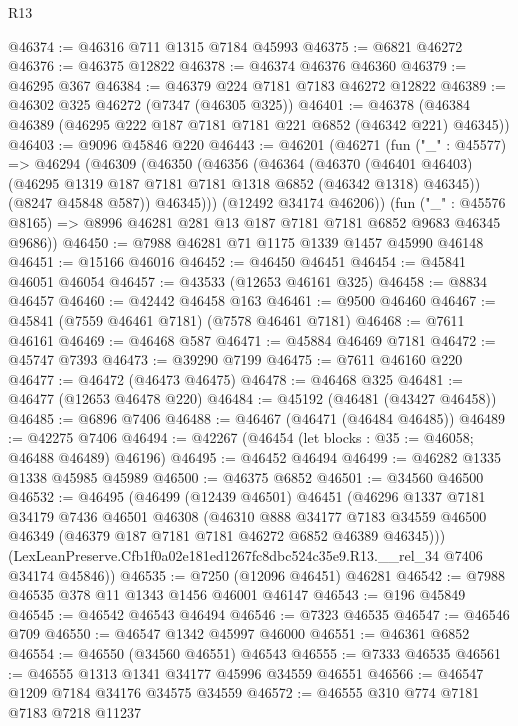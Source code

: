 \begin{lexlean}{R13}
\begin{coremodule}
@46374 := @46316 @711 @1315 @7184 @45993
@46375 := @6821 @46272
@46376 := @46375 @12822
@46378 := @46374 @46376 @46360
@46379 := @46295 @367
@46384 := @46379 @224 @7181 @7183 @46272 @12822
@46389 := @46302 @325 @46272 (@7347 (@46305 @325))
@46401 := @46378 (@46384 @46389 (@46295 @222 @187 @7181 @7181 @221 @6852 (@46342 @221) @46345))
@46403 := @9096 @45846 @220
@46443 := @46201
    (@46271
      (fun ("_" : @45577) =>
      @46294
        (@46309
          (@46350
            (@46356
              (@46364
                (@46370
                  (@46401 @46403)
                  (@46295 @1319 @187 @7181 @7181 @1318 @6852 (@46342 @1318) @46345))
                (@8247 @45848 @587))
              @46345)))
        (@12492 @34174 @46206))
      (fun ("_" : @45576 @8165) => @8996 @46281 @281 @13 @187 @7181 @7181 @6852 @9683 @46345 @9686))
@46450 := @7988 @46281 @71 @1175 @1339 @1457 @45990 @46148
@46451 := @15166 @46016
@46452 := @46450 @46451
@46454 := @45841 @46051 @46054
@46457 := @43533 (@12653 @46161 @325)
@46458 := @8834 @46457
@46460 := @42442 @46458 @163
@46461 := @9500 @46460
@46467 := @45841 (@7559 @46461 @7181) (@7578 @46461 @7181)
@46468 := @7611 @46161
@46469 := @46468 @587
@46471 := @45884 @46469 @7181
@46472 := @45747 @7393
@46473 := @39290 @7199
@46475 := @7611 @46160 @220
@46477 := @46472 (@46473 @46475)
@46478 := @46468 @325
@46481 := @46477 (@12653 @46478 @220)
@46484 := @45192 (@46481 (@43427 @46458))
@46485 := @6896 @7406
@46488 := @46467 (@46471 (@46484 @46485))
@46489 := @42275 @7406
@46494 := @42267 (@46454 (let blocks : @35 := @46058; @46488 @46489) @46196)
@46495 := @46452 @46494
@46499 := @46282 @1335 @1338 @45985 @45989
@46500 := @46375 @6852
@46501 := @34560 @46500
@46532 := @46495
    (@46499
      (@12439 @46501)
      @46451
      (@46296
        @1337
        @7181
        @34179
        @7436
        @46501
        @46308
        (@46310
          @888
          @34177
          @7183
          @34559
          @46500
          @46349
          (@46379 @187 @7181 @7181 @46272 @6852 @46389 @46345)))
      (LexLeanPreserve.Cfb1f0a02e181ed1267fc8dbc524c35e9.R13.__rel_34 @7406 @34174 @45846))
@46535 := @7250 (@12096 @46451) @46281
@46542 := @7988 @46535 @378 @11 @1343 @1456 @46001 @46147
@46543 := @196 @45849
@46545 := @46542 @46543 @46494
@46546 := @7323 @46535
@46547 := @46546 @709
@46550 := @46547 @1342 @45997 @46000
@46551 := @46361 @6852
@46554 := @46550 (@34560 @46551) @46543
@46555 := @7333 @46535
@46561 := @46555 @1313 @1341 @34177 @45996 @34559 @46551
@46566 := @46547 @1209 @7184 @34176 @34575 @34559
@46572 := @46555 @310 @774 @7181 @7183 @7218 @11237

\end{coremodule}
\end{lexlean}
